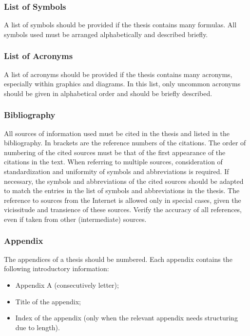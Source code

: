 \subsubsection{List of Symbols}

A list of symbols should be provided if the thesis contains many formulas. All symbols used must be arranged alphabetically and described briefly.

\subsubsection{List of Acronyms}

A list of acronyms should be provided if the thesis contains many acronyms, especially within graphics and diagrams. In this list, only uncommon acronyms should be given in alphabetical order and should be briefly described.

\subsubsection{Bibliography}

All sources of information used must be cited in the thesis and listed in the bibliography. In brackets are the reference numbers of the citations. The order of numbering of the cited sources must be that of the first appearance of the citations in the text. When referring to multiple sources, consideration of standardization and uniformity of symbols and abbreviations is required. If necessary, the symbols and abbreviations of the cited sources should be adapted to match the entries in the list of symbols and abbreviations in the thesis. The reference to sources from the Internet is allowed only in special cases, given the vicissitude and transience of these sources. Verify the accuracy of all references, even if taken from other (intermediate) sources.

\subsubsection{Appendix}
\label{sec:appendix}

The appendices of a thesis should be numbered. Each appendix contains the following introductory information:
\begin{itemize}
  \item Appendix A (consecutively letter);
  \item Title of the appendix;
  \item Index of the appendix (only when the relevant appendix needs structuring due to length).
\end{itemize}

